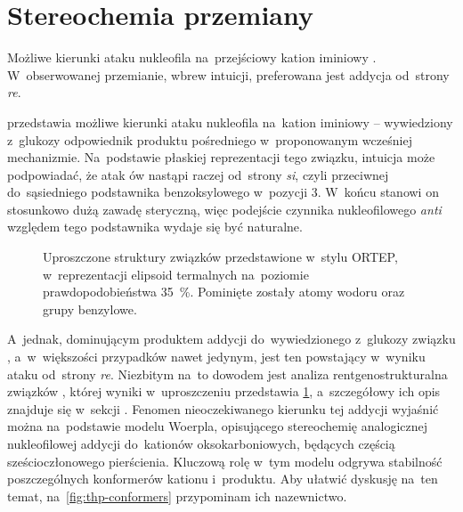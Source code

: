 \section{Stereochemia przemiany}\label{numeric:stereo}

\begin{marginfigure}
  
  \caption{
    Możliwe kierunki ataku nukleofila na~przejściowy kation iminiowy .
    W~obserwowanej przemianie, wbrew intuicji, preferowana jest addycja od~strony \textit{re}.
  }\label{fig:direction}
\end{marginfigure}

 przedstawia możliwe kierunki ataku nukleofila na~kation iminiowy
   \--- wywiedziony z~glukozy odpowiednik produktu pośredniego 
  w~proponowanym wcześniej mechanizmie.
Na~podstawie płaskiej reprezentacji tego związku, intuicja może podpowiadać, że atak ów
  nastąpi raczej od~strony \textit{si}, czyli przeciwnej do~sąsiedniego podstawnika
  benzoksylowego w~pozycji 3.
W~końcu stanowi on stosunkowo dużą zawadę steryczną, więc podejście czynnika nukleofilowego
  \textit{anti} względem tego podstawnika wydaje się być naturalne.

\begin{figure}
  
  \caption{
    Uproszczone struktury związków  przedstawione
      w~stylu ORTEP, w~reprezentacji elipsoid termalnych na~poziomie prawdopodobieństwa
      \SI{35}{\percent}.
    Pominięte zostały atomy wodoru oraz grupy benzylowe.
  }\label{fig:xray}
\end{figure}

A~jednak, dominującym produktem addycji do~wywiedzionego z~glukozy związku ,
  a~w~większości przypadków nawet jedynym, jest ten powstający w~wyniku ataku od~strony \textit{re}.
Niezbitym na~to dowodem jest analiza rentgenostrukturalna związków
  , której wyniki w~uproszczeniu przedstawia \cref{fig:xray},
  a~szczegółowy ich opis znajduje się w~sekcji .
Fenomen nieoczekiwanego kierunku tej addycji wyjaśnić można na~podstawie modelu Woerpla,
  opisującego stereochemię analogicznej nukleofilowej addycji do~kationów oksokarboniowych,
  będących częścią sześcioczłonowego pierścienia.
Kluczową rolę w~tym modelu odgrywa stabilność poszczególnych konformerów kationu i~produktu.
Aby ułatwić dyskusję na~ten temat,
  na~\cref{fig:thp-conformers} przypominam ich nazewnictwo.

